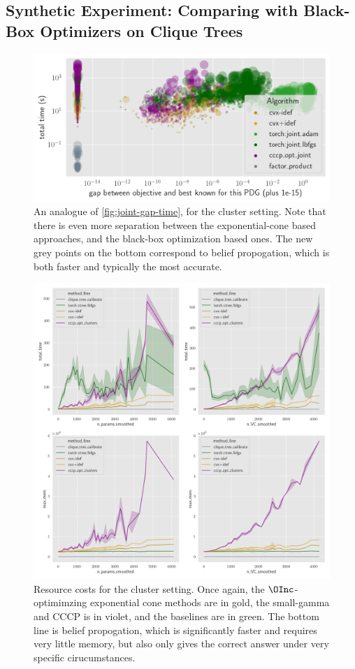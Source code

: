 \subsection{Synthetic Experiment: Comparing with Black-Box Optimizers
  on Clique Trees} \label{sec:clus-expt-details} 

\begin{figure}
    \centering
    \includegraphics[width=0.67\linewidth]{figs/rand-clus/gap-vs-time}
    \caption{An analogue of \cref{fig:joint-gap-time}, for the cluster setting.
    Note that there is even more separation between the exponential-cone based approaches, and the black-box optimization based ones.
    The new grey points on the bottom correspond to belief propogation, which is both faster and typically the most accurate.}
    \label{fig:clus-gap-vs-time}
\end{figure}
\begin{figure}
    \centering
    \includegraphics[width=0.67\linewidth]{figs/rand-clus/resource-costs}
    \caption{Resource costs for the cluster setting. Once again, the $\OInc$-optimimzing exponential cone methods are in gold, the small-gamma and CCCP is in violet, and the baselines are in green. The bottom line is belief propogation, which is significantly faster and requires very little memory, but also only gives the correct answer under very specific cirucumstances.}
    \label{fig:clus-resource-costs}
\end{figure}

